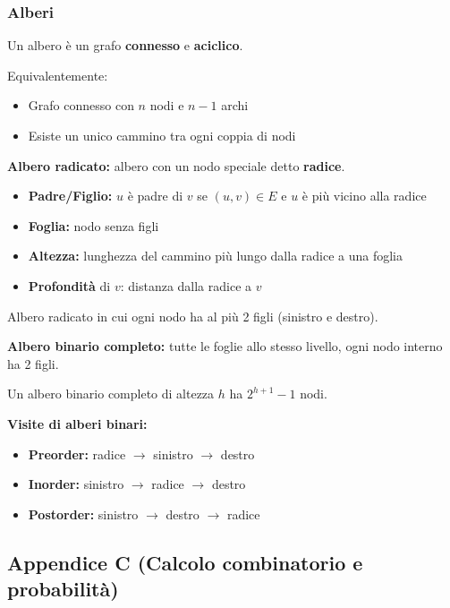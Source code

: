 \subsubsection{Alberi}

\begin{definizione}[Albero]
	Un albero è un grafo \textbf{connesso} e \textbf{aciclico}.
	
	Equivalentemente:
	\begin{itemize}
		\item Grafo connesso con $n$ nodi e $n-1$ archi
		\item Esiste un unico cammino tra ogni coppia di nodi
	\end{itemize}
\end{definizione}

\textbf{Albero radicato:} albero con un nodo speciale detto \textbf{radice}.
\begin{itemize}
	\item \textbf{Padre/Figlio:} $u$ è padre di $v$ se $(u,v) \in E$ e $u$ è più vicino alla radice
	\item \textbf{Foglia:} nodo senza figli
	\item \textbf{Altezza:} lunghezza del cammino più lungo dalla radice a una foglia
	\item \textbf{Profondità} di $v$: distanza dalla radice a $v$
\end{itemize}

\begin{definizione}
	Albero radicato in cui ogni nodo ha al più 2 figli (sinistro e destro).
	
	\textbf{Albero binario completo:} tutte le foglie allo stesso livello, ogni nodo interno ha 2 figli.
	
	Un albero binario completo di altezza $h$ ha $2^{h+1} - 1$ nodi.
\end{definizione}

\textbf{Visite di alberi binari:}
\begin{itemize}
	\item \textbf{Preorder:} radice $\to$ sinistro $\to$ destro
	\item \textbf{Inorder:} sinistro $\to$ radice $\to$ destro
	\item \textbf{Postorder:} sinistro $\to$ destro $\to$ radice
\end{itemize}

\subsection{Appendice C (Calcolo combinatorio e probabilità)}

